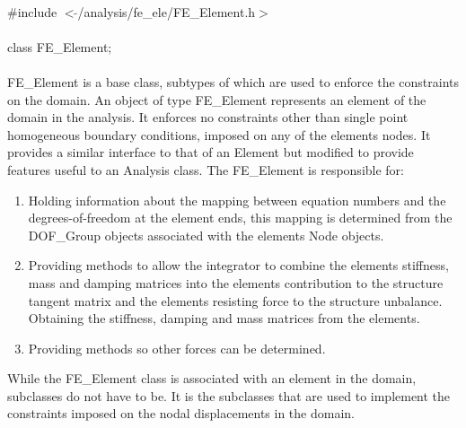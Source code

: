 
   \\
\indent \#include $<\tilde{ }$/analysis/fe\_ele/FE\_Element.h$>$  \\

  \\
\indent class FE\_Element;  \\

  \\
\indent FE\_Element is a base class, subtypes of which are used to
enforce the constraints on the domain. An object of type FE\_Element
represents an element of the domain in the analysis. It enforces no
constraints other than single point homogeneous boundary conditions,
imposed on any of the elements nodes. It provides a similar interface
to that of an Element but modified to provide features useful to an
Analysis class.  The FE\_Element is responsible for: \begin{enumerate}
\item Holding information about the mapping between equation numbers
and the degrees-of-freedom at the 
element ends, this mapping is determined from the DOF\_Group objects
associated with the elements Node objects. \item Providing methods to
allow the integrator to combine the elements stiffness, mass and
damping matrices into the elements contribution to the structure
tangent matrix and the elements resisting force to the structure
unbalance. Obtaining the stiffness, damping and mass matrices from the
elements. \item Providing methods so other forces can be
determined. \end{enumerate} While the FE\_Element class is
associated with an element in the domain, subclasses do not have to
be. It is the subclasses that are used to implement the constraints
imposed on the nodal displacements in the domain. \\

